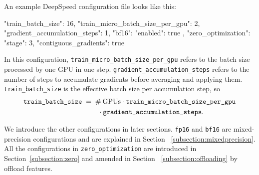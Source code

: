 An example DeepSpeed configuration file looks like this:

\begin{json}
{
    "train_batch_size": 16,
    "train_micro_batch_size_per_gpu": 2,
    "gradient_accumulation_steps": 1,
    "bf16": {
        "enabled": true
    },
    "zero_optimization": {
        "stage": 3,
        "contiguous_gradients": true
    }
}
\end{json}

In this configuration, \texttt{train\_micro\_batch\_size\_per\_gpu} refers to the 
batch size processed by one GPU in one step. \texttt{gradient\_accumulation\_steps} 
refers to the number of steps to accumulate gradients before averaging and applying 
them. \texttt{train\_batch\_size} is the effective batch size per accumulation step, 
so 
\begin{align*}
    \text{\texttt{train\_batch\_size}} \; &= \; 
    \# \: \text{GPUs} \cdot \text{\texttt{train\_micro\_batch\_size\_per\_gpu}} \\
    &\qquad \cdot \text{\texttt{gradient\_accumulation\_steps}} \text{.}
\end{align*}

We introduce the other configurations in later sections. \texttt{fp16} and 
\texttt{bf16} are mixed-precision configurations and are explained in Section~
\ref{subsection:mixedprecision}. All the configurations in \texttt{zero\_optimization} 
are introduced in Section~\ref{subsection:zero} and amended in Section~
\ref{subsection:offloading} by offload features.